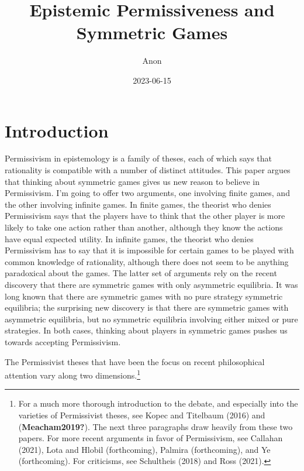 \documentclass[
  11pt,
]{article}
\title{Epistemic Permissiveness and Symmetric Games}
\author{Anon}
\date{2023-06-15}
\begin{document}
\maketitle

\hypertarget{introduction}{%
\section{Introduction}\label{introduction}}

Permissivism in epistemology is a family of theses, each of which says that rationality is compatible with a number of distinct attitudes. This paper argues that thinking about symmetric games gives us new reason to believe in Permissivism. I'm going to offer two arguments, one involving finite games, and the other involving infinite games. In finite games, the theorist who denies Permissivism says that the players have to think that the other player is more likely to take one action rather than another, although they know the actions have equal expected utility. In infinite games, the theorist who denies Permissivism has to say that it is impossible for certain games to be played with common knowledge of rationality, although there does not seem to be anything paradoxical about the games. The latter set of arguments rely on the recent discovery that there are symmetric games with only asymmetric equilibria. It was long known that there are symmetric games with no pure strategy symmetric equilibria; the surprising new discovery is that there are symmetric games with asymmetric equilibria, but no symmetric equilibria involving either mixed or pure strategies. In both cases, thinking about players in symmetric games pushes us towards accepting Permissivism.

The Permissivist theses that have been the focus on recent philosophical attention vary along two dimensions.\footnote{For a much more thorough introduction to the debate, and especially into the varieties of Permissivist theses, see Kopec and Titelbaum (2016) and (\textbf{Meacham2019?}). The next three paragraphs draw heavily from these two papers. For more recent arguments in favor of Permissivism, see Callahan (2021), Lota and Hlobil (forthcoming), Palmira (forthcoming), and Ye (forthcoming). For criticisms, see Schultheis (2018) and Ross (2021).}
\end{document}
